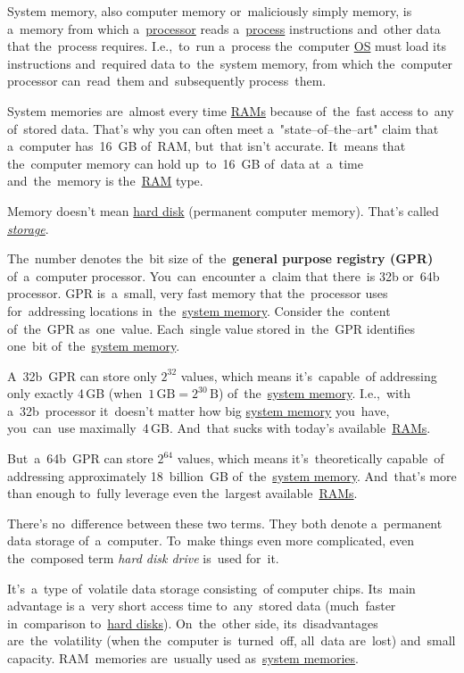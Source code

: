 \label{systemmemory}
System memory, also computer memory or~maliciously simply memory, is a~memory from which a~\hyperref[processorcpucore]{processor} reads a~\hyperref[applicationprocessprogramservicethread]{process} instructions and~other data that the~process requires. I.e.,~to~run a~process the~computer \hyperref[os]{OS} must load its instructions and~required data to~the~system memory, from which the~computer processor can~read~them and~subsequently process~them.

System memories are~almost every time \hyperref[ram]{RAMs} because of~the~fast access to~any of~stored data. That's why you can often meet a~"state--of--the--art" claim that a~computer has~16~GB of~RAM, but~that isn't accurate. It~means that the~computer memory can hold up~to~16~GB of~data at~a~time and~the~memory is the~\hyperref[ram]{RAM} type.

\warning Memory doesn't mean \hyperref[harddiskdrive]{hard disk} (permanent computer memory). That's called \hyperref[harddiskdrive]{\textit{storage}}.

\label{32bvs64b}
The~number denotes the~bit size of~the~\textbf{general purpose registry (GPR)} of~a~computer processor. You~can~encounter a~claim that there~is 32b or~64b processor. GPR is~a~small, very fast memory that the~processor uses for~addressing locations in~the~\hyperref[systemmemory]{system memory}. Consider the~content of~the~GPR as~one~value. Each~single value stored in~the~GPR identifies one~bit of~the~\hyperref[systemmemory]{system memory}.

A~32b~GPR can store only $2^{32}$ values, which means it's~capable~of addressing only exactly 4\,GB (when~$1\,\textrm{GB}=2^{30}\,\textrm{B}$) of~the~\hyperref[systemmemory]{system memory}. I.e.,~with a~32b~processor it~doesn't matter how big \hyperref[systemmemory]{system memory} you~have, you~can~use maximally~4\,GB. And~that sucks with today's available~\hyperref[ram]{RAMs}.

But~a~64b~GPR can store $2^{64}$ values, which means it's~theoretically capable~of addressing approximately 18~billion~GB of~the~\hyperref[systemmemory]{system memory}. And~that's more than enough to~fully leverage even the~largest available~\hyperref[ram]{RAMs}.

\label{harddiskdrive}
There's no~difference between these two terms. They both denote a~permanent data storage of~a~computer. To~make things even more complicated, even the~composed term \textit{hard disk drive} is~used for~it.

\label{ram}
It's~a~type of~volatile data storage consisting~of computer chips. Its~main advantage is a~very short access time to~any~stored data (much~faster in~comparison to~\hyperref[harddiskdrive]{hard disks}). On~the~other side, its~disadvantages are~the~volatility (when the~computer is~turned~off, all~data are~lost) and~small capacity. RAM~memories are~usually used as~\hyperref[systemmemory]{system memories}.
